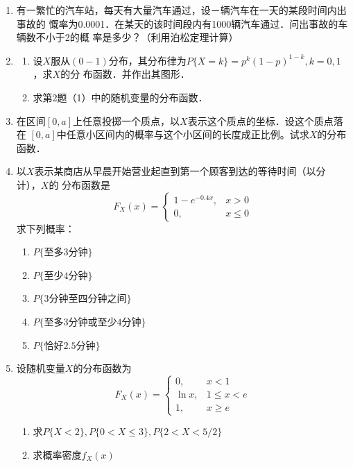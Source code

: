 \begin{enumerate}
    \item 有一繁忙的汽车站，每天有大量汽车通过，设－辆汽车在一天的某段时间内出事故的
    慨率为0.0001．在某天的该时间段内有1000辆汽车通过．问出事故的车辆数不小于2的概
    率是多少？（利用泊松定理计算）


    \item \begin{enumerate}
        \item 设$X$服从$(0-1)$分布，其分布律为$P\{X=k\}=p^k{(1-p)}^{1-k},k=0,1$，求$X$的分
        布函数．并作出其图形．
        \item 求第2题（1）中的随机变量的分布函数．
    \end{enumerate}


    \item 在区间$[0,a]$上任意投掷一个质点，以$X$表示这个质点的坐标．设这个质点落在
    $[0,a]$中任意小区间内的概率与这个小区间的长度成正比例。试求$X$的分布函数．


    \item 以$X$表示某商店从早晨开始营业起直到第一个顾客到达的等待时间（以分计），$X$的
    分布函数是
    $$F_X(x)=\left\{\begin{array}{ll}
        1-e^{-0.4x}, & x>0\\
        0, & x\leq 0
    \end{array}\right.$$
    求下列概率：
    \begin{enumerate}
        \item $P\{\mbox{至多3分钟}\}$
        \item $P\{\mbox{至少4分钟}\}$
        \item $P\{\mbox{3分钟至四分钟之间}\}$
        \item $P\{\mbox{至多3分钟或至少4分钟}\}$
        \item $P\{\mbox{恰好2.5分钟}\}$
    \end{enumerate}


    \item 设随机变量$X$的分布函数为
    $$F_X(x)=\left\{\begin{array}{ll}
        0, & x<1\\
        \ln x, & 1\leq x <e\\
        1, & x\geq e
    \end{array}\right.$$
    \begin{enumerate}
        \item 求$P\{X<2\},P\{0<X\leq 3\},P\{2<X<5/2\}$
        \item 求概率密度$f_X(x)$
    \end{enumerate}




\end{enumerate}
